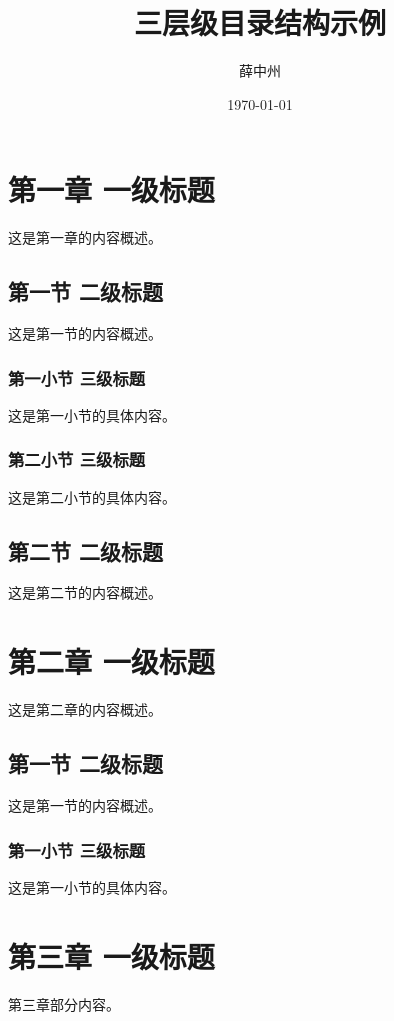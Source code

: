 \documentclass[UTF8]{ctexart} %
\begin{document}
\title{三层级目录结构示例}
\author{薛中州}
\date{\today}
\maketitle
\thispagestyle{empty} %


\pagestyle{plain} %
\tableofcontents%

\clearpage
\section{第一章 一级标题}
这是第一章的内容概述。

\subsection{第一节 二级标题}
这是第一节的内容概述。

\subsubsection{第一小节 三级标题}
这是第一小节的具体内容。

\subsubsection{第二小节 三级标题}
这是第二小节的具体内容。

\subsection{第二节 二级标题}
这是第二节的内容概述。

\clearpage
\section{第二章 一级标题}
这是第二章的内容概述。

\subsection{第一节 二级标题}
这是第一节的内容概述。

\subsubsection{第一小节 三级标题}
这是第一小节的具体内容。

\clearpage %
\section{第三章 一级标题}
第三章部分内容。
\end{document}
